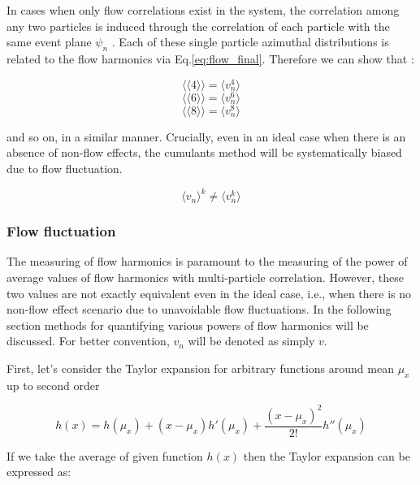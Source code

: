 In cases when only flow correlations exist in the system, the correlation among any two particles is induced through the correlation of each particle with the same event plane $\psi_n$ \cite{Wang:1991qh, Tsang:1991zza}.
Each of these single particle azimuthal distributions is related to the flow harmonics via Eq.\ref{eq:flow_final}. Therefore we can show that :

\begin{equation}
	\langle \langle 4 \rangle \rangle = \langle v_n^4 \rangle 
\label{eq:vn4}
\end{equation}
\begin{equation}
	\langle \langle 6 \rangle \rangle = \langle v_n^6 \rangle 
\label{eq:vn6}
\end{equation}
\begin{equation}
	\langle \langle 8 \rangle \rangle = \langle v_n^8 \rangle
\label{eq:vn8}
\end{equation}


and so on, in a similar manner. Crucially, even in an ideal case when there is an absence of non-flow effects, the cumulants method will be systematically biased due to flow fluctuation. 

\begin{equation}
	\langle v_n \rangle^k \neq \langle v_n^k \rangle
\end{equation}
\smallskip

\subsubsection{Flow fluctuation}	

The measuring of flow harmonics is paramount to the measuring of the power of average values of flow harmonics with multi-particle correlation. However, these two values are not exactly equivalent even in the ideal case, i.e., when there is no non-flow effect scenario due to unavoidable flow fluctuations. In the following section methods for quantifying various powers of flow harmonics will be discussed. For better convention, $v_n$ will be denoted as simply $v$.

First, let's consider the Taylor expansion for arbitrary functions around mean $\mu_x $ up to second order

\begin{equation}
	h(x) = h(\mu_x) + (x-\mu_x)h'(\mu_x)+\frac{(x-\mu_x)^2}{2!}h''(\mu_x)
\end{equation}
\smallskip

If we take the average of given function $h(x)$ then the Taylor expansion can be expressed as:

